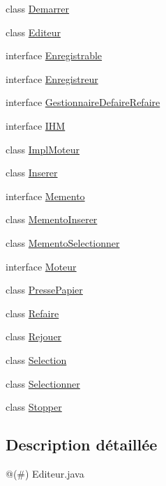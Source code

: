 \begin{DoxyCompactItemize}
\item 
class \hyperlink{classfr_1_1istic_1_1m1_1_1aco_1_1miniediteur_1_1v1_1_1Demarrer}{Demarrer}
\item 
class \hyperlink{classfr_1_1istic_1_1m1_1_1aco_1_1miniediteur_1_1v1_1_1Editeur}{Editeur}
\item 
interface \hyperlink{interfacefr_1_1istic_1_1m1_1_1aco_1_1miniediteur_1_1v1_1_1Enregistrable}{Enregistrable}
\item 
interface \hyperlink{interfacefr_1_1istic_1_1m1_1_1aco_1_1miniediteur_1_1v1_1_1Enregistreur}{Enregistreur}
\item 
interface \hyperlink{interfacefr_1_1istic_1_1m1_1_1aco_1_1miniediteur_1_1v1_1_1GestionnaireDefaireRefaire}{Gestionnaire\+Defaire\+Refaire}
\item 
interface \hyperlink{interfacefr_1_1istic_1_1m1_1_1aco_1_1miniediteur_1_1v1_1_1IHM}{I\+HM}
\item 
class \hyperlink{classfr_1_1istic_1_1m1_1_1aco_1_1miniediteur_1_1v1_1_1ImplMoteur}{Impl\+Moteur}
\item 
class \hyperlink{classfr_1_1istic_1_1m1_1_1aco_1_1miniediteur_1_1v1_1_1Inserer}{Inserer}
\item 
interface \hyperlink{interfacefr_1_1istic_1_1m1_1_1aco_1_1miniediteur_1_1v1_1_1Memento}{Memento}
\item 
class \hyperlink{classfr_1_1istic_1_1m1_1_1aco_1_1miniediteur_1_1v1_1_1MementoInserer}{Memento\+Inserer}
\item 
class \hyperlink{classfr_1_1istic_1_1m1_1_1aco_1_1miniediteur_1_1v1_1_1MementoSelectionner}{Memento\+Selectionner}
\item 
interface \hyperlink{interfacefr_1_1istic_1_1m1_1_1aco_1_1miniediteur_1_1v1_1_1Moteur}{Moteur}
\item 
class \hyperlink{classfr_1_1istic_1_1m1_1_1aco_1_1miniediteur_1_1v1_1_1PressePapier}{Presse\+Papier}
\item 
class \hyperlink{classfr_1_1istic_1_1m1_1_1aco_1_1miniediteur_1_1v1_1_1Refaire}{Refaire}
\item 
class \hyperlink{classfr_1_1istic_1_1m1_1_1aco_1_1miniediteur_1_1v1_1_1Rejouer}{Rejouer}
\item 
class \hyperlink{classfr_1_1istic_1_1m1_1_1aco_1_1miniediteur_1_1v1_1_1Selection}{Selection}
\item 
class \hyperlink{classfr_1_1istic_1_1m1_1_1aco_1_1miniediteur_1_1v1_1_1Selectionner}{Selectionner}
\item 
class \hyperlink{classfr_1_1istic_1_1m1_1_1aco_1_1miniediteur_1_1v1_1_1Stopper}{Stopper}
\end{DoxyCompactItemize}


\subsection{Description détaillée}
@(\#) Editeur.\+java 